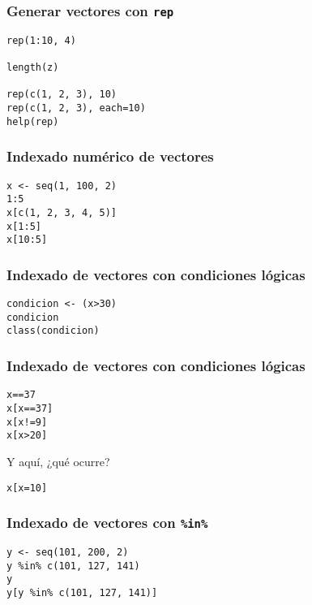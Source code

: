 \documentclass{beamer}
\begin{document}
\begin{frame}[fragile]
\frametitle{Generar vectores con \texttt{rep}}
\label{sec-1-1-6}


\lstset{language=R}
\begin{lstlisting}
rep(1:10, 4)

length(z)

rep(c(1, 2, 3), 10)
rep(c(1, 2, 3), each=10)
help(rep)
\end{lstlisting}
\end{frame}
\begin{frame}[fragile]
\frametitle{Indexado numérico de vectores}
\label{sec-1-1-7}



\lstset{language=R}
\begin{lstlisting}
x <- seq(1, 100, 2)
1:5
x[c(1, 2, 3, 4, 5)]
x[1:5]
x[10:5]
\end{lstlisting}
\end{frame}
\begin{frame}[fragile]
\frametitle{Indexado de vectores con condiciones lógicas}
\label{sec-1-1-8}


\lstset{language=R}
\begin{lstlisting}
condicion <- (x>30)
condicion
class(condicion)
\end{lstlisting}
\end{frame}
\begin{frame}[fragile]
\frametitle{Indexado de vectores con condiciones lógicas}
\label{sec-1-1-9}



\lstset{language=R}
\begin{lstlisting}
x==37
x[x==37]
x[x!=9]
x[x>20]
\end{lstlisting}
\begin{block}{Y aquí, ¿qué ocurre?}
\label{sec-1-1-9-1}



\lstset{language=R}
\begin{lstlisting}
x[x=10]
\end{lstlisting}
     
\end{block}
\end{frame}
\begin{frame}[fragile]
\frametitle{Indexado de vectores con \texttt{\%in\%}}
\label{sec-1-1-10}


\lstset{language=R}
\begin{lstlisting}
y <- seq(101, 200, 2)
y %in% c(101, 127, 141)
y
y[y %in% c(101, 127, 141)]
\end{lstlisting}
\end{frame}
\end{document}
